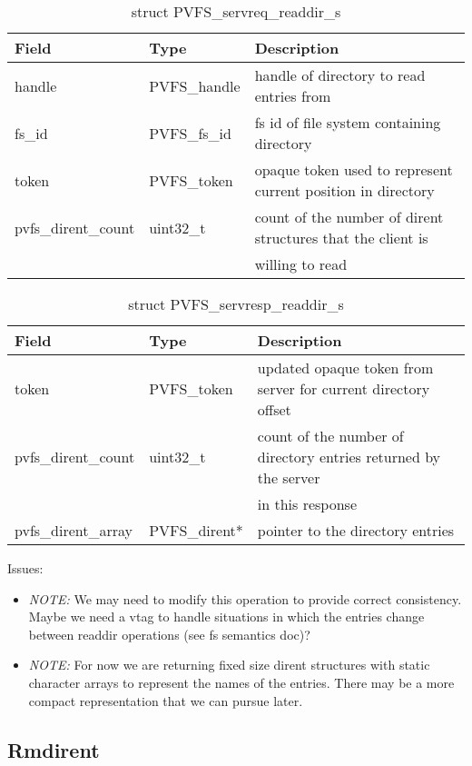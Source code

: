 \documentclass[11pt, letterpaper]{article} %
\begin{document}
\begin{table}[H]
\begin{tabular}{|l|l|l|}
\hline
Field & Type & Description \\
\hline
\hline
handle & PVFS\_handle & handle of directory to read entries from\\
\hline
fs\_id & PVFS\_fs\_id & fs id of file system containing directory\\
\hline
token & PVFS\_token & opaque token used to represent current position in
directory\\
\hline
pvfs\_dirent\_count & uint32\_t & count of the number of dirent
structures that the client is\\
 & & willing to read\\
\hline
\end{tabular}
\caption{struct PVFS\_servreq\_readdir\_s \label{tab:reqreaddir}}
\end{table}

\begin{table}[H]
\begin{tabular}{|l|l|l|}
\hline
Field & Type & Description \\
\hline
\hline
token & PVFS\_token & updated opaque token from server for current
directory offset\\
\hline
pvfs\_dirent\_count & uint32\_t & count of the number of directory
entries returned by the server\\
 & & in this response\\
\hline
pvfs\_dirent\_array & PVFS\_dirent* & pointer to the directory entries\\
\hline
\end{tabular}
\caption{struct PVFS\_servresp\_readdir\_s \label{tab:respreaddir}}
\end{table}

Issues:
\begin{itemize}
\item \emph{NOTE:} We may need to modify this operation to provide
correct consistency.  Maybe we need a vtag to handle situations in which
the entries change between readdir operations (see fs semantics doc)?
\item \emph{NOTE:} For now we are returning fixed size dirent structures
with static character arrays to represent the names of the entries.
There may be a more compact representation that we can pursue later.
\end{itemize}


\subsection{Rmdirent}
\end{document}
